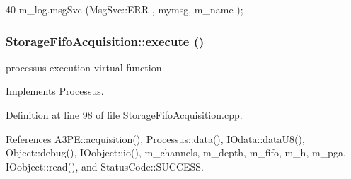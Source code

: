 \begin{DoxyCode}
40 { m_log.msgSvc (MsgSvc::ERR     , mymsg, m_name ); }
\end{DoxyCode}
\hypertarget{classStorageFifoAcquisition_a36ffcd2b9bd7ff721c4d0b638b8e4901}{
\subsubsection[{execute}]{ StorageFifoAcquisition::execute ()}}
\label{classStorageFifoAcquisition_a36ffcd2b9bd7ff721c4d0b638b8e4901}
processus execution virtual function 

Implements \hyperlink{classProcessus_a63767a63a1fb0055c5aa45b21a4a5d58}{Processus}.

Definition at line 98 of file StorageFifoAcquisition.cpp.

References A3PE::acquisition(), Processus::data(), IOdata::dataU8(), Object::debug(), IOobject::io(), m\_\-channels, m\_\-depth, m\_\-fifo, m\_\-h, m\_\-pga, IOobject::read(), and StatusCode::SUCCESS.


